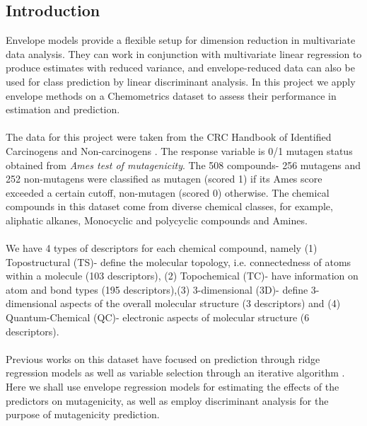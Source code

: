 \documentclass[8pt]{llncs}
\begin{document}
\begin{multicols}{2}
\section{Introduction}
Envelope models \cite{cook} provide a flexible setup for dimension reduction in multivariate data analysis. They can work in conjunction with multivariate linear regression to produce estimates with reduced variance, and envelope-reduced data can also be used for class prediction by linear discriminant analysis. In this project we apply envelope methods on a Chemometrics dataset to assess their performance in estimation and prediction.
\paragraph{}The data for this project were taken from the CRC Handbook of Identified Carcinogens and Non-carcinogens \cite{crc}. The response variable is 0/1 mutagen status obtained from \textit{Ames test of mutagenicity}. The 508 compounds- 256 mutagens and 252 non-mutagens were classified as mutagen (scored 1) if its Ames score exceeded a certain cutoff, non-mutagen (scored 0) otherwise. The chemical compounds in this dataset come from diverse chemical classes, for example, aliphatic alkanes, Monocyclic and polycyclic compounds and Amines.
\paragraph{}We have 4 types of descriptors for each chemical compound, namely (1) Topostructural (TS)- define the molecular topology, i.e. connectedness of atoms within a molecule (103 descriptors), 
(2) Topochemical (TC)- have information on atom and bond types (195 descriptors),(3) 3-dimensional (3D)- define 3-dimensional aspects of the overall molecular structure (3 descriptors) and (4) Quantum-Chemical (QC)- electronic aspects of molecular structure (6 descriptors).
\paragraph{}Previous works on this dataset have focused on prediction through ridge regression models \cite{hawk} as well as variable selection through an iterative algorithm \cite{majum}. Here we shall use envelope regression models for estimating the effects of the predictors on mutagenicity, as well as employ discriminant analysis for the purpose of mutagenicity prediction.



\end{multicols}
\end{document}
